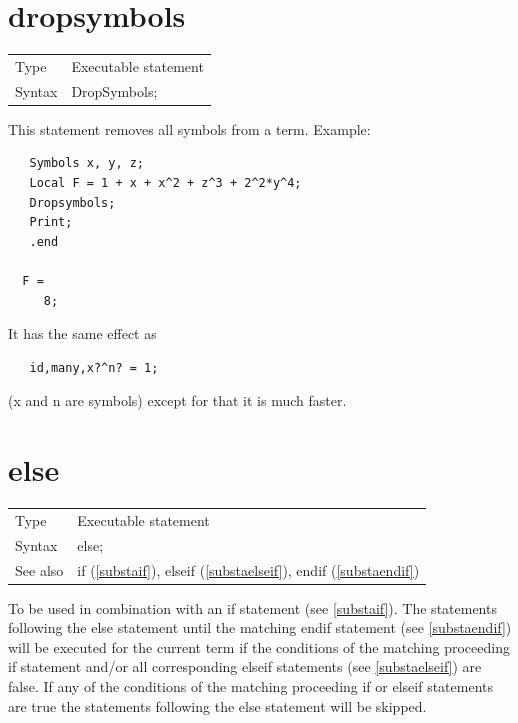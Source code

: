 
\section{dropsymbols}
\label{substadropsymbols}

\noindent \begin{tabular}{ll}
Type & Executable statement\\
Syntax & DropSymbols;
\end{tabular} \vspace{4mm}

\noindent This statement removes all symbols from a term. Example:
\begin{verbatim}
   Symbols x, y, z;
   Local F = 1 + x + x^2 + z^3 + 2^2*y^4;
   Dropsymbols;
   Print;
   .end

  F =
     8;
\end{verbatim}
\vspace{4mm}
It has the same effect as
\begin{verbatim}
   id,many,x?^n? = 1;
\end{verbatim}
(x and n are symbols) except for that it is much faster.
\vspace{10mm}


\section{else}
\label{substaelse}

\noindent \begin{tabular}{ll}
Type & Executable statement\\
Syntax & else;
\\ See also & if (\ref{substaif}),
              elseif (\ref{substaelseif}),
              endif (\ref{substaendif})
\end{tabular} \vspace{4mm}

\noindent To be used in combination with an if statement (see 
\ref{substaif}). The statements following the
else statement until the matching 
endif 
statement (see \ref{substaendif}) will be executed for the current term if 
the conditions of the matching proceeding if 
statement and/or all corresponding elseif statements (see 
\ref{substaelseif}) are false. If any of the conditions of the matching 
proceeding if or elseif statements are true the statements following the 
else statement will be skipped. \vspace{10mm}


